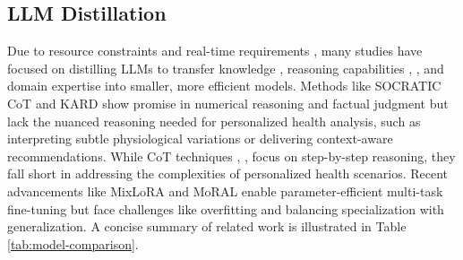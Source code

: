 \documentclass[preprint,12pt]{elsarticle}
\begin{document}
\subsection{LLM Distillation}
Due to resource constraints and real-time requirements \cite{huang2024new}, many studies have focused on distilling LLMs to transfer knowledge \cite{mcdonald2024reducing}, reasoning capabilities \cite{li2024turning}, \cite{kang2024knowledge}, and domain expertise \cite{yuan2024LLM} into smaller, more efficient models. Methods like SOCRATIC CoT \cite{shridhar2022distilling} and KARD \cite{kang2024knowledge} show promise in numerical reasoning and factual judgment but lack the nuanced reasoning needed for personalized health analysis, such as interpreting subtle physiological variations or delivering context-aware recommendations. While CoT techniques \cite{wei2022chain}, \cite{kojima2022large}, \cite{fu2023specializing} focus on step-by-step reasoning, they fall short in addressing the complexities of personalized health scenarios. Recent advancements like MixLoRA \cite{li2024mixlora} and MoRAL \cite{yang2024moral} enable parameter-efficient multi-task fine-tuning but face challenges like overfitting and balancing specialization with generalization.
A concise summary of related work is illustrated in Table \ref{tab:model-comparison}.
\end{document}
